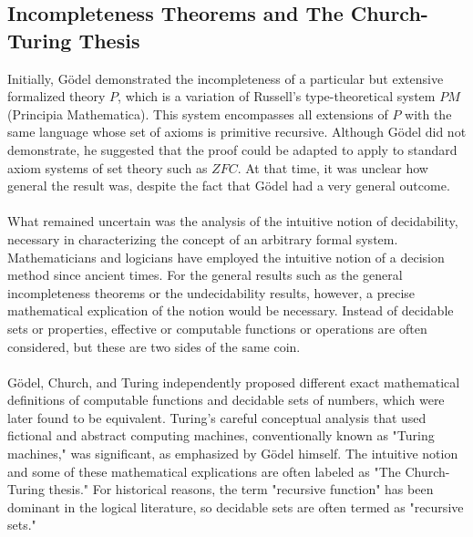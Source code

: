 \documentclass[10pt,a4paper]{article}
\newcounter{theo}
\begin{document}
                        \subsection{Incompleteness Theorems and The Church-Turing Thesis}
                            Initially, Gödel demonstrated the incompleteness of a particular but extensive formalized theory $P$, which is a variation of Russell's type-theoretical system $PM$ (Principia Mathematica). This system encompasses all extensions of $P$ with the same language whose set of axioms is primitive recursive. Although Gödel did not demonstrate, he suggested that the proof could be adapted to apply to standard axiom systems of set theory such as $ZFC$. At that time, it was unclear how general the result was, despite the fact that Gödel had a very general outcome.
                            \\
                            \\
                            What remained uncertain was the analysis of the intuitive notion of decidability, necessary in characterizing the concept of an arbitrary formal system. Mathematicians and logicians have employed the intuitive notion of a decision method since ancient times. For the general results such as the general incompleteness theorems or the undecidability results, however, a precise mathematical explication of the notion would be necessary. Instead of decidable sets or properties, effective or computable functions or operations are often considered, but these are two sides of the same coin.
                            \\
                            \\
                            Gödel, Church, and Turing independently proposed different exact mathematical definitions of computable functions and decidable sets of numbers, which were later found to be equivalent. Turing's careful conceptual analysis that used fictional and abstract computing machines, conventionally known as "Turing machines," was significant, as emphasized by Gödel himself. The intuitive notion and some of these mathematical explications are often labeled as "The Church-Turing thesis." For historical reasons, the term "recursive function" has been dominant in the logical literature, so decidable sets are often termed as "recursive sets."
                            \\
                            \\
\end{document}
